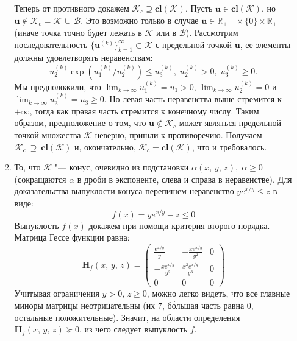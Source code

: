 \documentclass[a4paper,12pt]{article}
\begin{document}
\begin{enumerate}
\begin{enumerate}
			Теперь от противного докажем $\mathcal{K}_{c} \supseteq \textbf{cl}(\mathcal{K})$. Пусть $\mathbf{u} \in \textbf{cl}(\mathcal{K})$, но $\mathbf{u} \notin \mathcal{K}_c = \mathcal{K}\,\cup\, \mathcal{B}$. Это возможно только в случае $\mathbf{u} \in \mathbb{R}_{++}\times \{0\} \times \mathbb{R}_+$ (иначе точка точно будет лежать в $\mathcal{K}$ или в $\mathcal{B}$). Рассмотрим последовательность $\{ \mathbf{u}^{(k)} \}_{k=1}^{\infty} \subset \mathcal{K} $ с предельной точкой $\mathbf{u}$, ее элементы должны удовлетворять неравенствам:
			\begin{equation*}
				u_2^{(k)} \exp\left(u_1^{(k)}/u_2^{(k)}\right) \leqslant u_3^{(k)},\; u_2^{(k)} > 0,\; u_3^{(k)} \geqslant 0.
			\end{equation*}
			Мы предположили, что $\lim_{k\rightarrow\infty} u_1^{(k)} = u_1 > 0$, $\lim_{k\rightarrow\infty} u_2^{(k)} = 0 $ и $\lim_{k\rightarrow\infty} u_3^{(k)} = u_3 \geqslant 0$. Но левая часть неравенства выше стремится к $+\infty$, тогда как правая часть стремится к конечному числу. Таким образом, предположение о том, что $\mathbf{u} \notin \mathcal{K}_c$ может являться предельной точкой множества $\mathcal{K}$ неверно, пришли к противоречию. Получаем $\mathcal{K}_{c}~\supseteq~\textbf{cl}(\mathcal{K})$ и, окончательно, $\mathcal{K}_{c} = \textbf{cl}(\mathcal{K})$, что и требовалось.
			

			\item 
			То, что $\mathcal{K}$ "--- конус, очевидно из подстановки $\alpha (x,\,y,\,z),\; \alpha\geqslant 0$ (сокращаются $\alpha$ в дроби в экспоненте, слева и справа в неравенстве). Для доказательства выпуклости конуса перепишем неравенство $y e^{x/y} \leqslant z$ в виде:
			\begin{equation*}
				f(x) = y e^{x/y} - z \leqslant 0
			\end{equation*}
			Выпуклость $f(x)$ докажем при помощи критерия второго порядка. Матрица Гессе функции равна: 
			\begin{equation*}
				\mathbf{H}_f(x,\,y,\,z) = 
				\begin{pmatrix}
					\frac{e^{x/y}}{y} & -\frac{xe^{x/y}}{y^2} & 0 \\
					-\frac{xe^{x/y}}{y^2} & \frac{x^2e^{x/y}}{y^3} & 0 \\
					0 & 0 & 0
 				\end{pmatrix}
			\end{equation*}
			Учитывая ограничения $y > 0,\, z \geqslant 0$, можно легко видеть, что все главные миноры матрицы неотрицательны (их 7, б\'{о}льшая часть равна 0, остальные положительные). Значит, на области определения $\mathbf{H}_f(x,\,y,\,z) \succeq 0$, из чего следует выпуклость $f$.
			

\end{enumerate}
\end{enumerate}
\end{document}

